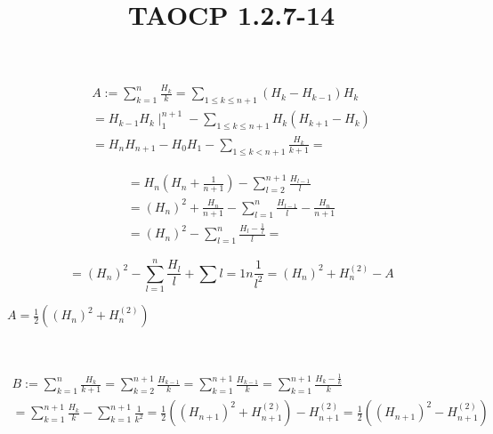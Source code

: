\documentclass{article}
\title{TAOCP 1.2.7\mbox{-}14}
\begin{document}
\maketitle

\begin{multline*}
A := \sum_{k=1}^{n} \frac{H_{k}}{k} = \sum_{1\leq k \leq n+1} (H_{k} - H_{k-1}) H_{k} \\
= H_{k-1}H_{k}\mid_{1}^{n+1} - \sum_{1 \leq k \leq n+1} H_{k} (H_{k+1}-H_{k}) \\
= H_{n} H_{n+1} - H_{0} H_{1} - \sum_{1 \leq k < n+1} \frac{H_{k}}{k+1} =
\end{multline*}

\begin{multline*}
= H_{n}(H_{n} + \frac{1}{n+1}) - \sum_{l=2}^{n+1} \frac{H_{l-1}}{l} \\
= {(H_{n})}^{2} + \frac{H_{n}}{n+1} - \sum_{l=1}^{n} \frac{H_{l-1}}{l} - \frac{H_{n}}{n+1} \\
= {(H_{n})}^{2} - \sum_{l=1}^{n} \frac{H_{l} - \frac{1}{l}}{l} =
\end{multline*}

\[ = {(H_{n})}^{2} - \sum_{l=1}^{n} \frac{H_{l}}{l} + \sum{l=1}{n}\frac{1}{l^{2}} = {(H_{n})}^{2} + H_{n}^{(2)} - A \]

\( A = \frac{1}{2}({(H_{n})}^{2} + H_{n}^{(2)}) \)

\(  \)

\begin{multline*}
B := \sum_{k=1}^{n} \frac{H_{k}}{k+1} = \sum_{k=2}^{n+1} \frac{H_{k-1}}{k} = \sum_{k=1}^{n+1} \frac{H_{k-1}}{k} = \sum_{k=1}^{n+1} \frac{H_{k} - \frac{1}{k}}{k} \\
= \sum_{k=1}^{n+1} \frac{H_{k}}{k} - \sum_{k=1}^{n+1} \frac{1}{k^{2}} = \frac{1}{2}({(H_{n+1})}^{2} + H_{n+1}^{(2)}) - H_{n+1}^{(2)} = \frac{1}{2}({(H_{n+1})}^{2} - H_{n+1}^{(2)})
\end{multline*}
\end{document}
